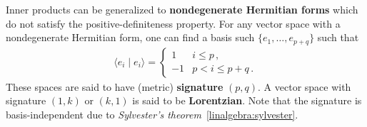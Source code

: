     \begin{remark}\label{linalgebra:NDH_form}
        Inner products can be generalized to \textbf{nondegenerate Hermitian forms} which do not satisfy the positive-definiteness property. For any vector space with a nondegenerate Hermitian form, one can find a basis such $\{e_1,\ldots,e_{p+q}\}$ such that
        \begin{gather}
            \langle e_i\mid e_i \rangle=
            \begin{cases}
                1&i\leq p\,,\\
                -1&p<i\leq p+q\,.
            \end{cases}
        \end{gather}
        These spaces are said to have (metric) \textbf{signature} $(p,q)$. A vector space with signature $(1,k)$ or $(k,1)$ is said to be \textbf{Lorentzian}. Note that the signature is basis-independent due to \textit{Sylvester's theorem}~\ref{linalgebra:sylvester}.
    \end{remark}

